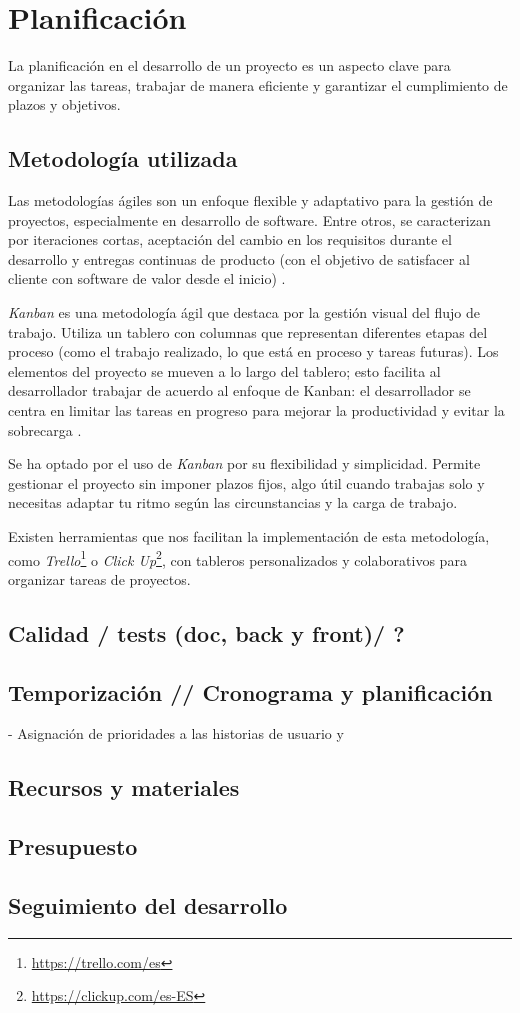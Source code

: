 \chapter{Planificación}

La planificación en el desarrollo de un proyecto es un aspecto clave para organizar las tareas, trabajar de manera eficiente y garantizar el cumplimiento de plazos y objetivos.

\section{Metodología utilizada}
Las metodologías ágiles son un enfoque flexible y adaptativo para la gestión de proyectos, especialmente en desarrollo de software. Entre otros, se caracterizan por iteraciones cortas, aceptación del cambio en los requisitos durante el desarrollo y entregas continuas de producto (con el objetivo de satisfacer al cliente con software de valor desde el inicio) \cite{agileprinciples}.

\textit{Kanban} es una metodología ágil que destaca por la gestión visual del flujo de trabajo. Utiliza un tablero con columnas que representan diferentes etapas del proceso (como el trabajo realizado, lo que está en proceso y tareas futuras). Los elementos del proyecto se mueven a lo largo del tablero; esto facilita al desarrollador trabajar de acuerdo al enfoque de Kanban: el desarrollador se centra en limitar las tareas en progreso para mejorar la productividad y evitar la sobrecarga \cite{majkamastering}.

Se ha optado por el uso de \textit{Kanban} por su flexibilidad y simplicidad. Permite gestionar el proyecto sin imponer plazos fijos, algo útil cuando trabajas solo y necesitas adaptar tu ritmo según las circunstancias y la carga de trabajo.

Existen herramientas que nos facilitan la implementación de esta metodología, como \textit{Trello}\footnote{\url{https://trello.com/es}} o \textit{Click Up}\footnote{\url{https://clickup.com/es-ES}}, con tableros personalizados y colaborativos para organizar tareas de proyectos.

\section{Calidad / tests (doc, back y front)/ ?}

\section{Temporización // Cronograma y planificación}
- Asignación de prioridades a las historias de usuario y 

\section{Recursos y materiales}

\section{Presupuesto}

\section{Seguimiento del desarrollo}
